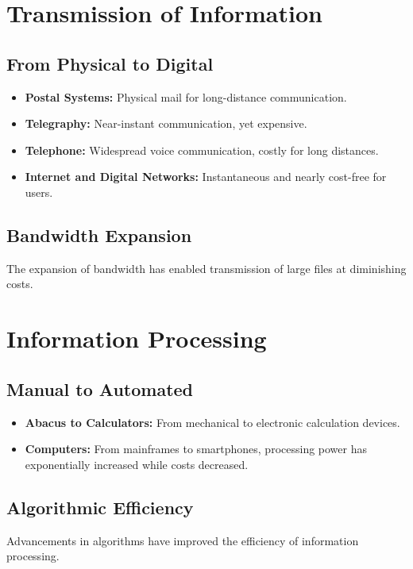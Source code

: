 \documentclass[10pt,titlepage]{book}
\begin{document}
\section{Transmission of Information}

\subsection{From Physical to Digital}
\begin{itemize}
    \item \textbf{Postal Systems:} Physical mail for long-distance communication.
    \item \textbf{Telegraphy:} Near-instant communication, yet expensive.
    \item \textbf{Telephone:} Widespread voice communication, costly for long distances.
    \item \textbf{Internet and Digital Networks:} Instantaneous and nearly cost-free for users.
\end{itemize}

\subsection{Bandwidth Expansion}
The expansion of bandwidth has enabled transmission of large files at diminishing costs.

\section{Information Processing}

\subsection{Manual to Automated}
\begin{itemize}
    \item \textbf{Abacus to Calculators:} From mechanical to electronic calculation devices.
    \item \textbf{Computers:} From mainframes to smartphones, processing power has exponentially increased while costs decreased.
\end{itemize}

\subsection{Algorithmic Efficiency}
Advancements in algorithms have improved the efficiency of information processing.
\end{document}
